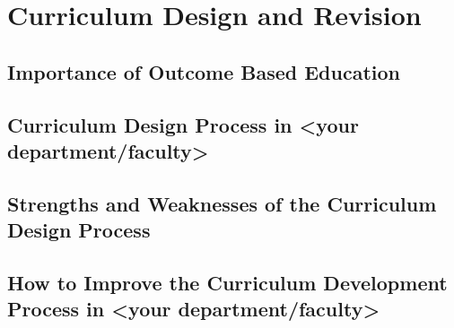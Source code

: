 \chapter{Curriculum Design and Revision}
\section{Importance of Outcome Based Education}
\section{Curriculum Design Process in <your department/faculty>}
\section{Strengths and Weaknesses of the Curriculum Design Process}
\section{How to Improve the Curriculum Development Process in <your department/faculty>}